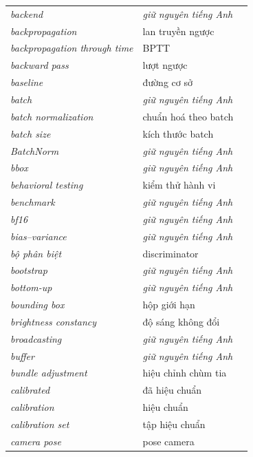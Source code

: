 \documentclass[deep_learning.tex]{subfiles}
\begin{document}
\begin{longtable}{@{}L{5.2cm}L{5.9cm}L{2.6cm}@{}}
\emph{backend} & \emph{\color{tiercol}giữ nguyên tiếng Anh} & \\
\emph{backpropagation} & lan truyền ngược & \\
\emph{backpropagation through time} & BPTT & \\
\emph{backward pass} & lượt ngược & \\
\emph{baseline} & đường cơ sở & \\
\emph{batch} & \emph{\color{tiercol}giữ nguyên tiếng Anh} & \\
\emph{batch normalization} & chuẩn hoá theo batch & \\
\emph{batch size} & kích thước batch & \\
\emph{BatchNorm} & \emph{\color{tiercol}giữ nguyên tiếng Anh} & \\
\emph{bbox} & \emph{\color{tiercol}giữ nguyên tiếng Anh} & \\
\emph{behavioral testing} & kiểm thử hành vi & \\
\emph{benchmark} & \emph{\color{tiercol}giữ nguyên tiếng Anh} & \\
\emph{bf16} & \emph{\color{tiercol}giữ nguyên tiếng Anh} & \\
\emph{bias--variance} & \emph{\color{tiercol}giữ nguyên tiếng Anh} & \\
\emph{bộ phân biệt} & discriminator & \\
\emph{bootstrap} & \emph{\color{tiercol}giữ nguyên tiếng Anh} & \\
\emph{bottom-up} & \emph{\color{tiercol}giữ nguyên tiếng Anh} & \\
\emph{bounding box} & hộp giới hạn & \\
\emph{brightness constancy} & độ sáng không đổi & \\
\emph{broadcasting} & \emph{\color{tiercol}giữ nguyên tiếng Anh} & \\
\emph{buffer} & \emph{\color{tiercol}giữ nguyên tiếng Anh} & \\
\emph{bundle adjustment} & hiệu chỉnh chùm tia & \\
\emph{calibrated} & đã hiệu chuẩn & \\
\emph{calibration} & hiệu chuẩn & \\
\emph{calibration set} & tập hiệu chuẩn & \\
\emph{camera pose} & pose camera & \\

\end{longtable}
\end{document}
